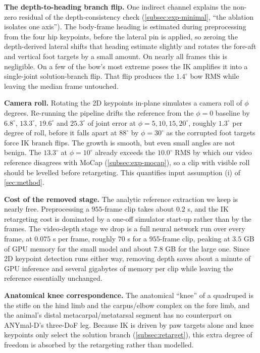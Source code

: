 \textbf{The depth-to-heading branch flip.} One indirect channel explains the non-zero residual of the depth-consistency check (\autoref{subsec:exp-minimal}, ``the ablation isolates one axis''). The body-frame heading is estimated during preprocessing from the four hip keypoints, before the lateral pin is applied, so zeroing the depth-derived lateral shifts that heading estimate slightly and rotates the fore-aft and vertical foot targets by a small amount. On nearly all frames this is negligible. On a few of the bow's most extreme poses the IK amplifies it into a single-joint solution-branch flip. That flip produces the $1.4^\circ$ bow RMS while leaving the median frame untouched.

\textbf{Camera roll.} Rotating the 2D keypoints in-plane simulates a camera roll of $\phi$ degrees. Re-running the pipeline drifts the reference from the $\phi{=}0$ baseline by $6.8^\circ$, $13.3^\circ$, $19.6^\circ$ and $25.3^\circ$ of joint error at $\phi=5,10,15,20^\circ$, roughly $1.3^\circ$ per degree of roll, before it falls apart at $88^\circ$ by $\phi=30^\circ$ as the corrupted foot targets force IK branch flips. The growth is smooth, but even small angles are not benign. The $13.3^\circ$ at $\phi{=}10^\circ$ already exceeds the $10.0^\circ$ RMS by which our video reference disagrees with MoCap (\autoref{subsec:exp-mocap}), so a clip with visible roll should be levelled before retargeting. This quantifies input assumption (i) of \autoref{sec:method}.

\textbf{Cost of the removed stage.} The analytic reference extraction we keep is nearly free. Preprocessing a $955$-frame clip takes about $0.2$ s, and the IK retargeting cost is dominated by a one-off simulator start-up rather than by the frames. The video-depth stage we drop is a full neural network run over every frame, at $0.075$ s per frame, roughly $70$ s for a $955$-frame clip, peaking at $3.5$ GB of GPU memory for the small model and about $7.8$ GB for the large one. Since 2D keypoint detection runs either way, removing depth saves about a minute of GPU inference and several gigabytes of memory per clip while leaving the reference essentially unchanged.

\textbf{Anatomical knee correspondence.} The anatomical ``knee'' of a quadruped is the stifle on the hind limb and the carpus/elbow complex on the fore limb, and the animal's distal metacarpal/metatarsal segment has no counterpart on ANYmal-D's three-DoF leg. Because IK is driven by paw targets alone and knee keypoints only select the solution branch (\autoref{subsec:retarget}), this extra degree of freedom is absorbed by the retargeting rather than modelled.

